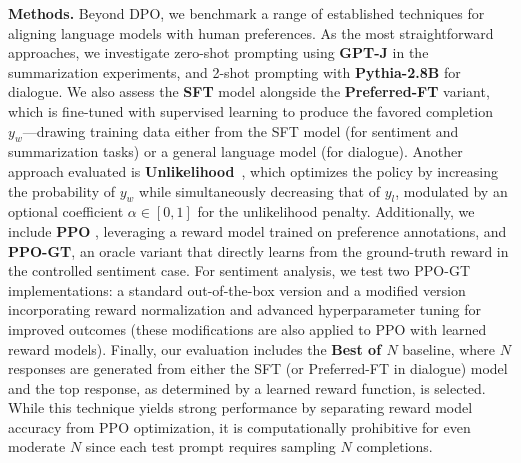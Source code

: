 \textbf{Methods.} Beyond DPO, we benchmark a range of established techniques for aligning language models with human preferences. As the most straightforward approaches, we investigate zero-shot prompting using \textbf{GPT-J} \citep{gpt-j} in the summarization experiments, and 2-shot prompting with \textbf{Pythia-2.8B} \citep{biderman2023pythia} for dialogue. We also assess the \textbf{SFT} model alongside the \textbf{Preferred-FT} variant, which is fine-tuned with supervised learning to produce the favored completion $y_w$—drawing training data either from the SFT model (for sentiment and summarization tasks) or a general language model (for dialogue). Another approach evaluated is \textbf{Unlikelihood}~\citep{welleck2019neural}, which optimizes the policy by increasing the probability of $y_w$ while simultaneously decreasing that of $y_l$, modulated by an optional coefficient $\alpha\in[0,1]$ for the unlikelihood penalty. Additionally, we include \textbf{PPO} \citep{schulman2017proximal}, leveraging a reward model trained on preference annotations, and \textbf{PPO-GT}, an oracle variant that directly learns from the ground-truth reward in the controlled sentiment case. For sentiment analysis, we test two PPO-GT implementations: a standard out-of-the-box version \cite{leandro_von_werra_2023_7790115} and a modified version incorporating reward normalization and advanced hyperparameter tuning for improved outcomes (these modifications are also applied to PPO with learned reward models). Finally, our evaluation includes the \textbf{Best of $N$} baseline, where $N$ responses are generated from either the SFT (or Preferred-FT in dialogue) model and the top response, as determined by a learned reward function, is selected. While this technique yields strong performance by separating reward model accuracy from PPO optimization, it is computationally prohibitive for even moderate $N$ since each test prompt requires sampling $N$ completions.